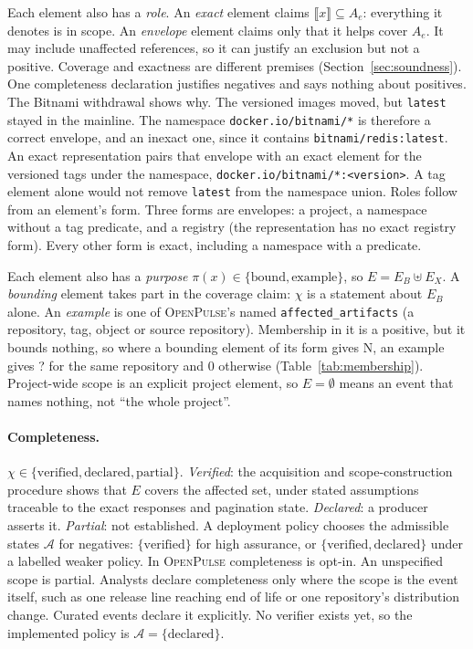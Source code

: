 \documentclass[11pt,a4paper]{article}
\newcommand{\op}{\textsc{OpenPulse}}
\newcommand{\code}[1]{\texttt{#1}}
\newcommand{\Non}{\textsf{N}}
\newcommand{\Ind}{\textsf{?}}
\newcommand{\NoA}{\textsf{0}}
\begin{document}
Each element also has a \emph{role}. An \emph{exact} element claims
$\llbracket x\rrbracket \subseteq A_e$: everything it denotes is in
scope. An \emph{envelope} element claims only that it helps cover
$A_e$. It may include unaffected references, so it can justify an
exclusion but not a positive. Coverage and exactness are different
premises (Section~\ref{sec:soundness}). One completeness declaration
justifies negatives and says nothing about positives. The Bitnami
withdrawal shows why. The versioned images moved, but \code{latest}
stayed in the mainline. The namespace \code{docker.io/bitnami/*} is
therefore a correct envelope, and an inexact one, since it contains
\code{bitnami/redis:latest}. An exact representation pairs that
envelope with an exact element for the versioned tags under the
namespace, \code{docker.io/bitnami/*:<version>}. A tag element alone
would not remove \code{latest} from the namespace union. Roles follow
from an element's form. Three forms are envelopes: a project, a
namespace without a tag predicate, and a registry (the representation
has no exact registry form). Every other form is exact, including a
namespace with a predicate.

Each element also has a \emph{purpose} $\pi(x) \in \{\text{bound},
\text{example}\}$, so $E = E_B \uplus E_X$. A \emph{bounding} element
takes part in the coverage claim: $\chi$ is a statement about $E_B$
alone. An \emph{example} is one of \op{}'s named
\code{affected\_artifacts} (a repository, tag, object or source
repository). Membership in it is a positive, but it bounds nothing, so
where a bounding element of its form gives \Non{}, an example gives
\Ind{} for the same repository and \NoA{} otherwise
(Table~\ref{tab:membership}). Project-wide scope is an explicit
project element, so $E = \emptyset$ means an event that names nothing,
not ``the whole project''.

\paragraph{Completeness.} $\chi \in \{\text{verified}, \text{declared},
\text{partial}\}$. \emph{Verified}: the acquisition and
scope-construction procedure shows that $E$ covers the affected set,
under stated assumptions traceable to the exact responses and
pagination state. \emph{Declared}: a producer asserts it.
\emph{Partial}: not established. A deployment policy chooses the
admissible states $\mathcal{A}$ for negatives: $\{\text{verified}\}$
for high assurance, or $\{\text{verified}, \text{declared}\}$ under a
labelled weaker policy. In \op{} completeness is opt-in. An unspecified
scope is partial. Analysts declare completeness only where the scope
is the event itself, such as one release line reaching end of life or
one repository's distribution change. Curated events declare it
explicitly. No verifier exists yet, so the implemented policy is
$\mathcal{A} = \{\text{declared}\}$.
\end{document}
